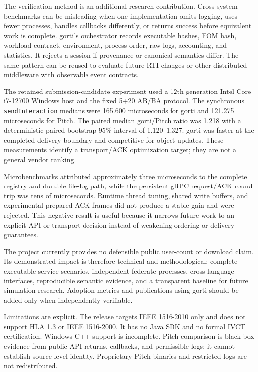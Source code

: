\documentclass[preprint,12pt,a4paper]{elsarticle}
\begin{document}
The verification method is an additional research contribution. Cross-system
benchmarks can be misleading when one implementation omits logging, uses fewer
processes, handles callbacks differently, or returns success before equivalent
work is complete. gorti's orchestrator records executable hashes, FOM hash,
workload contract, environment, process order, raw logs, accounting, and
statistics. It rejects a session if provenance or canonical semantics differ.
The same pattern can be reused to evaluate future RTI changes or other
distributed middleware with observable event contracts.

The retained submission-candidate experiment used a 12th generation Intel
Core i7-12700 Windows host and the fixed 5+20 AB/BA protocol. The synchronous
\texttt{sendInteraction} medians were 165.600 microseconds for gorti and
121.275 microseconds for Pitch. The paired median gorti/Pitch ratio was 1.218
with a deterministic paired-bootstrap 95\% interval of 1.120--1.327. gorti was
faster at the completed-delivery boundary and competitive for object updates.
These measurements identify a transport/ACK optimization target; they are not
a general vendor ranking.

Microbenchmarks attributed approximately three microseconds to the complete
registry and durable file-log path, while the persistent gRPC request/ACK
round trip was tens of microseconds. Runtime thread tuning, shared write
buffers, and experimental prepared ACK frames did not produce a stable gain
and were rejected. This negative result is useful because it narrows future
work to an explicit API or transport decision instead of weakening ordering or
delivery guarantees.

The project currently provides no defensible public user-count or download
claim. Its demonstrated impact is therefore technical and methodological:
complete executable service scenarios, independent federate processes,
cross-language interfaces, reproducible semantic evidence, and a transparent
baseline for future simulation research. Adoption metrics and publications
using gorti should be added only when independently verifiable.

Limitations are explicit. The release targets IEEE 1516-2010 only and does not
support HLA 1.3 or IEEE 1516-2000. It has no Java SDK and no formal IVCT
certification. Windows C++ support is incomplete. Pitch comparison is
black-box evidence from public API returns, callbacks, and permissible logs;
it cannot establish source-level identity. Proprietary Pitch binaries and
restricted logs are not redistributed.
\end{document}
